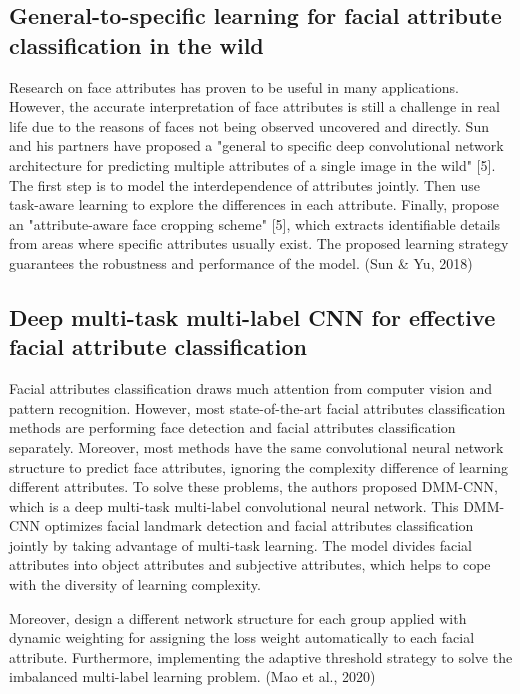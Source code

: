 \documentclass{article}
\begin{document}
\subsection{General-to-specific learning for facial attribute classification in the wild}
Research on face attributes has proven to be useful in many applications. However, the accurate interpretation of face attributes is still a challenge in real life due to the reasons of faces not being observed uncovered and directly. Sun and his partners have proposed a "general to specific deep convolutional network architecture for predicting multiple attributes of a single image in the wild" [5]. The first step is to model the interdependence of attributes jointly. Then use task-aware learning to explore the differences in each attribute. Finally, propose an "attribute-aware face cropping scheme" [5], which extracts identifiable details from areas where specific attributes usually exist. The proposed learning strategy guarantees the robustness and performance of the model. (Sun \& Yu, 2018)

\subsection{Deep multi-task multi-label CNN for effective facial attribute classification}
Facial attributes classification draws much attention from computer vision and pattern recognition. However, most state-of-the-art facial attributes classification methods are performing face detection and facial attributes classification separately.  Moreover, most methods have the same convolutional neural network structure to predict face attributes, ignoring the complexity difference of learning different attributes. To solve these problems, the authors proposed DMM-CNN, which is a deep multi-task multi-label convolutional neural network. This DMM-CNN optimizes facial landmark detection and facial attributes classification jointly by taking advantage of multi-task learning. The model divides facial attributes into object attributes and subjective attributes, which helps to cope with the diversity of learning complexity.

Moreover, design a different network structure for each group applied with dynamic weighting for assigning the loss weight automatically to each facial attribute. Furthermore, implementing the adaptive threshold strategy to solve the imbalanced multi-label learning problem. (Mao et al., 2020)
\end{document}
